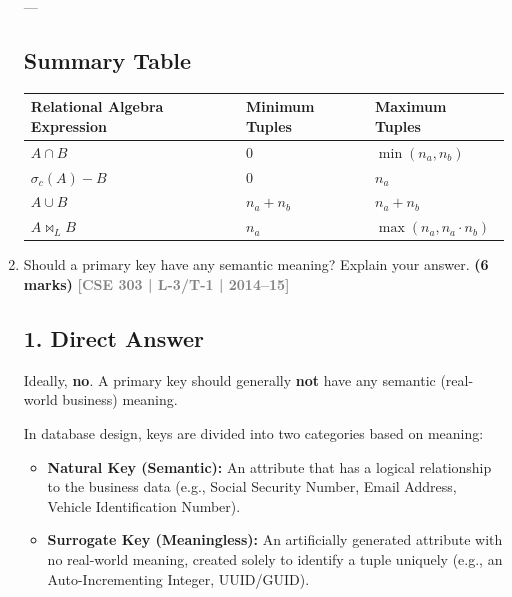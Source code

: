 \documentclass[12pt,a3paper]{article}
\newcommand{\yr}[1]{\hfill\textcolor{gray}{\small\textbf{[#1]}}}
\newcommand{\mk}[1]{\textcolor{orange!70!black}{\small\textbf{(#1 marks)}}}
\begin{document}
\begin{enumerate}
\begin{tcolorbox}[enhanced,breakable,ansbox,colback=cA!4,colframe=cA,boxrule=0.8pt,arc=5pt,title={\textbf{Answer}},fonttitle=\bfseries\color{white},colbacktitle=cA]
---

\subsection*{Summary Table}

\begin{center}
\renewcommand{\arraystretch}{1.5}
\begin{tabularx}{0.9\textwidth}{@{} >{\bfseries}l X X @{}}
\toprule
Relational Algebra Expression & Minimum Tuples & Maximum Tuples \\
\midrule
$A \cap B$ & $0$ & $\min(n_a, n_b)$ \\
$\sigma_c(A) - B$ & $0$ & $n_a$ \\
$A \cup B$ & $n_a + n_b$ & $n_a + n_b$ \\
$A \bowtie_L B$ & $n_a$ & $\max(n_a, n_a \cdot n_b)$ \\
\bottomrule
\end{tabularx}
\end{center}


\end{tcolorbox}


\item Should a primary key have any semantic meaning? Explain your answer.
\mk{6} \yr{CSE 303 | L-3/T-1 | 2014--15}

\begin{tcolorbox}[enhanced,breakable,ansbox,colback=cA!4,colframe=cA,boxrule=0.8pt,arc=5pt,title={\textbf{Answer}},fonttitle=\bfseries\color{white},colbacktitle=cA]

\subsection*{1. Direct Answer}
Ideally, \textbf{no}. A primary key should generally \textbf{not} have any semantic (real-world business) meaning. 

In database design, keys are divided into two categories based on meaning:
\begin{itemize}
    \item \textbf{Natural Key (Semantic):} An attribute that has a logical relationship to the business data (e.g., Social Security Number, Email Address, Vehicle Identification Number).
    \item \textbf{Surrogate Key (Meaningless):} An artificially generated attribute with no real-world meaning, created solely to identify a tuple uniquely (e.g., an Auto-Incrementing Integer, UUID/GUID).
\end{itemize}


\end{tcolorbox}
\end{enumerate}
\end{document}
